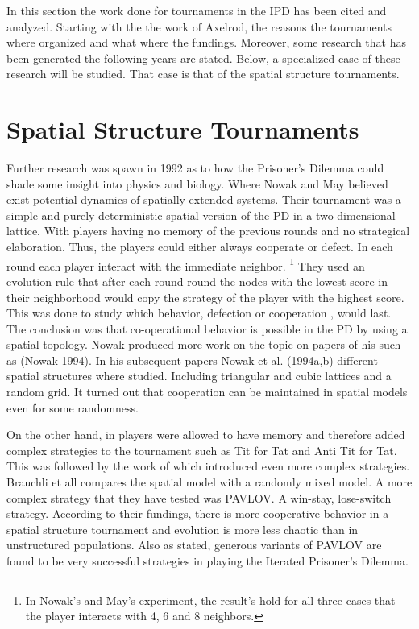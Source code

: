 In this section the work done for tournaments in the IPD has been cited and analyzed.
Starting with the the work of Axelrod, the reasons the tournaments where organized
and what where the fundings. Moreover, some research that has been generated the following
years are stated. Below, a specialized case of these research will be studied. That
case is that of the spatial structure tournaments.

\section{Spatial Structure Tournaments}

Further research was spawn in 1992 as to how the Prisoner's Dilemma could shade
some insight into physics and biology. Where Nowak and May believed exist potential
dynamics of spatially extended systems. Their tournament was a simple and purely
deterministic spatial version of the PD in a two dimensional lattice. With
players having no memory of the previous rounds and no strategical elaboration.
Thus, the players could either always cooperate or defect. In each round each
player interact with the immediate neighbor. \footnote{In Nowak's and May's
experiment, the result's hold for all three cases that  the player interacts with
4, 6 and 8 neighbors.} They used an evolution rule that after each round
round the nodes with the lowest score in their neighborhood would copy the
strategy of the player with the highest score. This was done to study which
behavior, defection or cooperation , would last. The conclusion was that co-operational
behavior is possible in the PD by using a spatial topology. Nowak produced more
work on the topic on papers of his such as \cite{Nowak1993} (Nowak 1994).
In his subsequent papers Nowak et al. (1994a,b)  different spatial structures
where studied. Including triangular and cubic lattices and a random grid.
It turned out that cooperation can be maintained in spatial models even
for some randomness.

On the other hand,  in \cite{Lindgren1994} players were allowed to have
memory and therefore added complex strategies to the tournament such as Tit for
Tat and  Anti Tit for Tat. This was followed  by the work of
\cite{Brauchli1999} which introduced even more complex strategies. Brauchli et
all compares the spatial model with a randomly mixed model.
A more complex strategy that they have tested was PAVLOV. A win-stay,
lose-switch strategy.  According to their
fundings, there is more cooperative behavior in a spatial structure tournament
and evolution is more less chaotic than in unstructured populations. Also as
stated, generous variants of PAVLOV are found to be very successful
strategies in playing the Iterated Prisoner's Dilemma.

